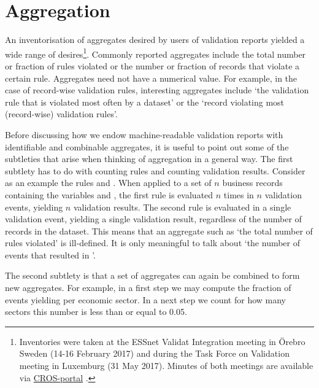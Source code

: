 \section{Aggregation}
An inventorisation of aggregates desired by users of validation reports
yielded a wide range of desires\footnote{Inventories were taken at 
the ESSnet Validat Integration meeting in \"Orebro Sweden (14-16 February 2017) and during
the Task Force on Validation meeting in Luxemburg (31 May 2017). Minutes of both
meetings are available via \href{https://ec.europa.eu/eurostat/cros}{CROS-portal} .}.
Commonly reported aggregates include the total number or fraction of rules
violated or the number or fraction of records  that violate a certain rule.
Aggregates need not have a numerical value. For example, in the case of
record-wise validation rules, interesting aggregates include `the validation
rule that is violated most often by a dataset' or the `record violating most
(record-wise) validation rules'. 

Before discussing how we endow machine-readable validation reports with
identifiable and combinable aggregates, it is useful to point out some of the
subtleties that arise when thinking of aggregation in a general way. The first
subtlety has to do with counting rules and counting validation results.
Consider as an example the rules  and .  When applied to a set of $n$ business records containing the variables
 and , the first rule is evaluated $n$ times in $n$
validation events, yielding $n$ validation results. The second rule is
evaluated in a single validation event, yielding a single validation result,
regardless of the number of records in the dataset. This means that an
aggregate such as `the total number of rules violated' is ill-defined. It is
only meaningful to talk about `the number of events that resulted in
\onwaar{}'. 

The second subtlety is that a set of aggregates can again be combined to form
new aggregates. For example, in a first step we may compute the fraction of
events yielding \onwaar{} per economic sector. In a next step we count for how
many sectors this number is less than or equal to 0.05.


